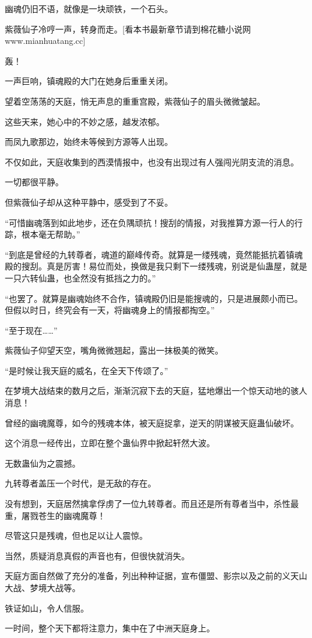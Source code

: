 \begin{this_body}
幽魂仍旧不语，就像是一块顽铁，一个石头。

紫薇仙子冷哼一声，转身而走。[看本书最新章节请到棉花糖小说网www.mianhuatang.cc]

轰！

一声巨响，镇魂殿的大门在她身后重重关闭。

望着空荡荡的天庭，悄无声息的重重宫殿，紫薇仙子的眉头微微皱起。

这些天来，她心中的不妙之感，越发浓郁。

而凤九歌那边，始终未等候到方源等人出现。

不仅如此，天庭收集到的西漠情报中，也没有出现过有人强闯光阴支流的消息。

一切都很平静。

但紫薇仙子却从这种平静中，感受到了不妥。

“可惜幽魂落到如此地步，还在负隅顽抗！搜刮的情报，对我推算方源一行人的行踪，根本毫无帮助。”

“到底是曾经的九转尊者，魂道的巅峰传奇。就算是一缕残魂，竟然能抵抗着镇魂殿的搜刮。真是厉害！易位而处，换做是我只剩下一缕残魂，别说是仙蛊屋，就是一只六转仙蛊，也全然没有抵挡之力的。”

“也罢了。就算是幽魂始终不合作，镇魂殿仍旧是能搜魂的，只是进展颇小而已。但假以时日，终究会有一天，将幽魂身上的情报都掏空。”

“至于现在……”

紫薇仙子仰望天空，嘴角微微翘起，露出一抹极美的微笑。

“是时候让我天庭的威名，在全天下传颂了。”

在梦境大战结束的数月之后，渐渐沉寂下去的天庭，猛地爆出一个惊天动地的骇人消息！

曾经的幽魂魔尊，如今的残魂本体，被天庭捉拿，逆天的阴谋被天庭蛊仙破坏。

这个消息一经传出，立即在整个蛊仙界中掀起轩然大波。

无数蛊仙为之震撼。

九转尊者盖压一个时代，是无敌的存在。

没有想到，天庭居然擒拿俘虏了一位九转尊者。而且还是所有尊者当中，杀性最重，屠戮苍生的幽魂魔尊！

尽管这只是残魂，但也足以让人震惊。

当然，质疑消息真假的声音也有，但很快就消失。

天庭方面自然做了充分的准备，列出种种证据，宣布僵盟、影宗以及之前的义天山大战、梦境大战等。

铁证如山，令人信服。

一时间，整个天下都将注意力，集中在了中洲天庭身上。


\end{this_body}
